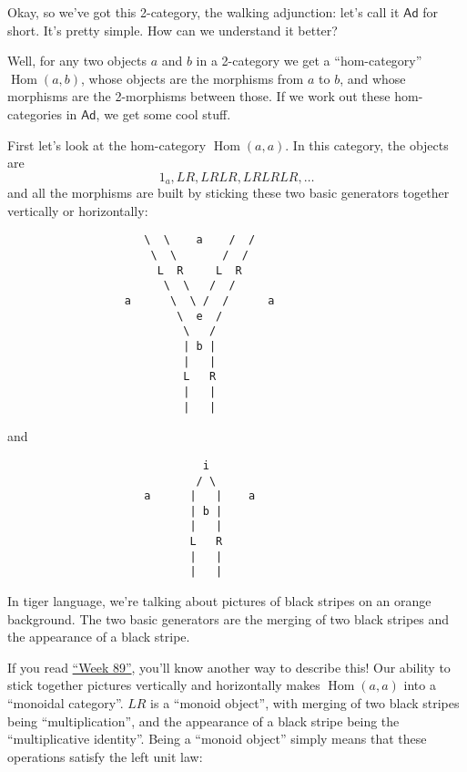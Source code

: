 \documentclass{article}
\begin{document}
Okay, so we've got this 2-category, the walking adjunction: let's call
it \(\mathsf{Ad}\) for short. It's pretty simple. How can we understand
it better?

Well, for any two objects \(a\) and \(b\) in a 2-category we get a
``hom-category'' \(\operatorname{Hom}(a,b)\), whose objects are the
morphisms from \(a\) to \(b\), and whose morphisms are the 2-morphisms
between those. If we work out these hom-categories in \(\mathsf{Ad}\),
we get some cool stuff.

First let's look at the hom-category \(\operatorname{Hom}(a,a)\). In
this category, the objects are \[1_a, LR, LRLR, LRLRLR, \ldots\] and all
the morphisms are built by sticking these two basic generators together
vertically or horizontally:

\begin{verbatim}
                     \  \    a    /  /  
                      \  \       /  /
                       L  R     L  R
                        \  \   /  /
                  a      \  \ /  /      a
                          \  e  /
                           \   /
                           | b |
                           |   |
                           L   R
                           |   |
                           |   |   
\end{verbatim}

and

\begin{verbatim}
                              i
                             / \
                     a      |   |    a
                            | b |     
                            |   |
                            L   R   
                            |   |
                            |   |
\end{verbatim}

In tiger language, we're talking about pictures of black stripes on an
orange background. The two basic generators are the merging of two black
stripes and the appearance of a black stripe.

If you read \protect\hyperlink{week89}{``Week 89''}, you'll know another
way to describe this! Our ability to stick together pictures vertically
and horizontally makes \(\operatorname{Hom}(a,a)\) into a ``monoidal
category''. \(LR\) is a ``monoid object'', with merging of two black
stripes being ``multiplication'', and the appearance of a black stripe
being the ``multiplicative identity''. Being a ``monoid object'' simply
means that these operations satisfy the left unit law:
\end{document}
